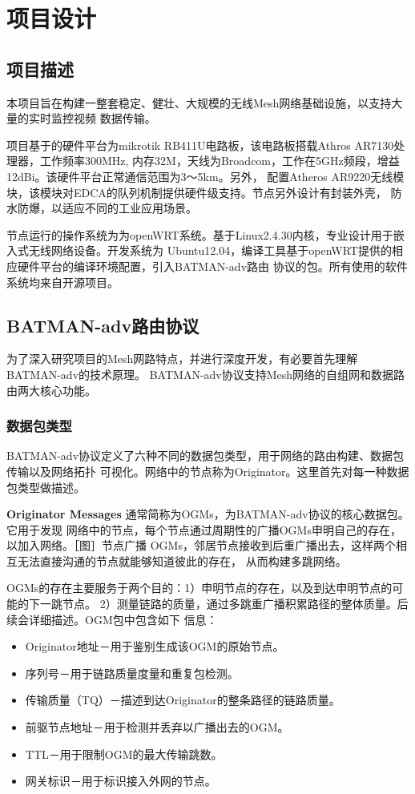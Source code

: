 \chapter{项目设计}
\label{cha:china}

\section{项目描述}
本项目旨在构建一整套稳定、健壮、大规模的无线Mesh网络基础设施，以支持大量的实时监控视频
数据传输。

项目基于的硬件平台为mikrotik RB411U电路板，该电路板搭载Athros AR7130处理器，工作频率300MHz,
内存32M，天线为Broadcom，工作在5GHz频段，增益12dBi。该硬件平台正常通信范围为3～5km。另外，
配置Atheros AR9220无线模块，该模块对EDCA的队列机制提供硬件级支持。节点另外设计有封装外壳，
防水防爆，以适应不同的工业应用场景。

节点运行的操作系统为为openWRT系统。基于Linux2.4.30内核，专业设计用于嵌入式无线网络设备。开发系统为
Ubuntu12.04，编译工具基于openWRT提供的相应硬件平台的编译环境配置，引入BATMAN-adv路由
协议的包。所有使用的软件系统均来自开源项目。

\section{BATMAN-adv路由协议}
为了深入研究项目的Mesh网路特点，并进行深度开发，有必要首先理解BATMAN-adv的技术原理。
BATMAN-adv协议支持Mesh网络的自组网和数据路由两大核心功能。

\subsection{数据包类型}
BATMAN-adv协议定义了六种不同的数据包类型，用于网络的路由构建、数据包传输以及网络拓扑
可视化。网络中的节点称为Originator。这里首先对每一种数据包类型做描述。

\textbf{Originator Messages} 通常简称为OGMs，为BATMAN-adv协议的核心数据包。它用于发现
网络中的节点，每个节点通过周期性的广播OGMs申明自己的存在，以加入网络。［图］节点广播
OGMs，邻居节点接收到后重广播出去，这样两个相互无法直接沟通的节点就能够知道彼此的存在，
从而构建多跳网络。

OGMs的存在主要服务于两个目的：1）申明节点的存在，以及到达申明节点的可能的下一跳节点。
2）测量链路的质量，通过多跳重广播积累路径的整体质量。后续会详细描述。OGM包中包含如下
信息：
\begin{itemize}
\item Originator地址－用于鉴别生成该OGM的原始节点。
\item 序列号－用于链路质量度量和重复包检测。
\item 传输质量（TQ）－描述到达Originator的整条路径的链路质量。
\item 前驱节点地址－用于检测并丢弃以广播出去的OGM。
\item TTL－用于限制OGM的最大传输跳数。
\item 网关标识－用于标识接入外网的节点。
\end{itemize}

